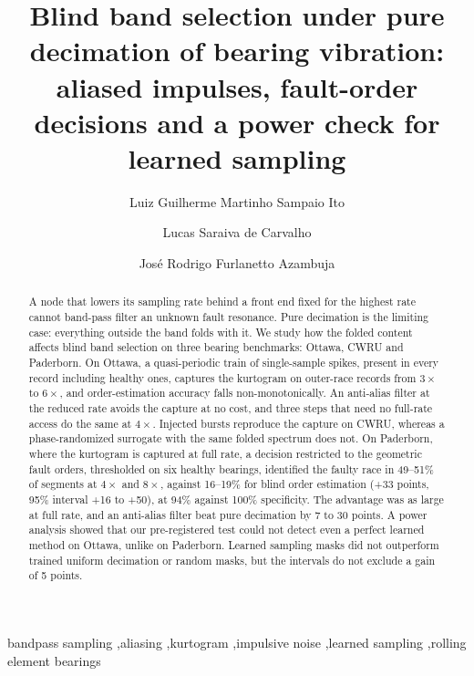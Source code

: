 \documentclass[preprint,12pt]{elsarticle}
\begin{document}
\begin{frontmatter}

\title{Blind band selection under pure decimation of bearing vibration: aliased impulses,
fault-order decisions and a power check for learned sampling}

\author[ufrgs]{Luiz Guilherme Martinho Sampaio Ito}
\author[ufrgs]{Lucas Saraiva de Carvalho}
\author[ufrgs]{Jos\'e Rodrigo Furlanetto Azambuja}

\begin{abstract}
A node that lowers its sampling rate behind a front end fixed for the highest rate cannot band-pass
filter an unknown fault resonance. Pure decimation is the limiting case: everything outside the band
folds with it. We study how the folded content affects blind band selection on three bearing
benchmarks: Ottawa, CWRU and Paderborn. On Ottawa, a quasi-periodic train of single-sample spikes,
present in every record including healthy ones, captures the kurtogram on outer-race records from
$3\times$ to $6\times$, and order-estimation accuracy falls non-monotonically. An
anti-alias filter at the reduced rate avoids the capture at no cost, and three steps that need no
full-rate access do the same at $4\times$. Injected bursts reproduce the capture on CWRU, whereas a
phase-randomized surrogate with the same folded spectrum does not. On Paderborn, where the
kurtogram is captured at full rate, a decision restricted to the geometric fault orders,
thresholded on six healthy bearings, identified the faulty race in 49--51\% of segments at $4\times$
and $8\times$, against 16--19\% for blind order estimation (+33 points, 95\% interval +16 to +50),
at 94\% against 100\% specificity. The advantage was as large at full rate, and an anti-alias
filter beat pure decimation by 7 to 30 points. A power analysis showed that our pre-registered test
could not detect even a perfect learned method on Ottawa, unlike on Paderborn. Learned sampling
masks did not outperform trained uniform decimation or random masks, but the intervals do not
exclude a gain of 5 points.
\end{abstract}

\begin{keyword}
bandpass sampling \sep aliasing \sep kurtogram \sep impulsive noise \sep learned sampling
\sep rolling element bearings
\end{keyword}

\end{frontmatter}
\end{document}
